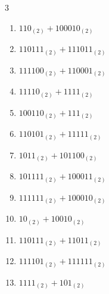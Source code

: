 \begin{multicols}{3}
\begin{enumerate}
  \item $110_{(2)} + 100010_{(2)}$


  \item $110111_{(2)} + 111011_{(2)}$


  \item $111100_{(2)} + 110001_{(2)}$


  \item $11110_{(2)} + 1111_{(2)}$


\columnbreak %

\resetques

  \item $100110_{(2)} + 111_{(2)}$


  \item $110101_{(2)} + 11111_{(2)}$


  \item $1011_{(2)} + 101100_{(2)}$


  \item $101111_{(2)} + 100011_{(2)}$


  \item $111111_{(2)} + 100010_{(2)}$


  \item $10_{(2)} + 10010_{(2)}$


  \item $110111_{(2)} + 11011_{(2)}$


  \item $111101_{(2)} + 111111_{(2)}$


  \item $1111_{(2)} + 101_{(2)}$



\end{enumerate}
\end{multicols}
